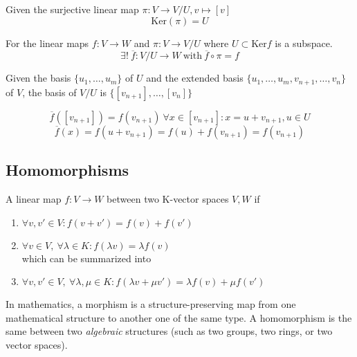 \begin{proposition}
   Given the surjective linear map \(\pi: V \to V/U, v \mapsto [v]\)
   \[\text{Ker}(\pi) = U\]
\end{proposition}
\begin{remark} %
   For the linear maps \(f: V \to W\) and \(\pi: V \to V/U\) where \(U \subset \text{Ker}f\) is a subspace.
   \[\exists!~\overline{f}: V/U \to W~\text{with}~\overline{f} \circ \pi = f\]

   \begin{center}
   \end{center}

   Given the basis \(\{u_1, \ldots, u_m\}\) of \(U\) and the extended basis \(\{u_1, \ldots, u_m, v_{n+1}, \ldots, v_n\}\) of \(V\), the basis of \(V/U\) is \(\{[v_{n+1}], \ldots, [v_n]\}\)

   \[\overline{f}([v_{n+1}]) = f(v_{n+1})~\forall x \in [v_{n+1}]: x = u + v_{n+1}, u \in U\]
   \[\overline{f}(x) = f(u + v_{n+1}) = f(u) + f(v_{n+1}) = f(v_{n+1})\]
\end{remark}

\subsection{Homomorphisms}
\begin{definition}[Homomorphism]
   A linear map \(f: V \to W\) between two K-vector spaces \(V, W\) if

   \begin{enumerate}[label=(\roman*)]
      \item \(\forall v, v' \in V: f(v + v') = f(v) + f(v')\)
      \item \(\forall v \in V,~\forall \lambda \in K: f(\lambda v) = \lambda f(v)\)\\
      which can be summarized into
      \item \(\forall v, v' \in V,~\forall \lambda, \mu \in K: f(\lambda v + \mu v') = \lambda f(v) + \mu f(v')\)
   \end{enumerate}
\end{definition}
\begin{remark}
   In mathematics, a morphism is a structure-preserving map from one mathematical structure to another one of the same type.
   A homomorphism is the same between two \textit{algebraic} structures (such as two groups, two rings, or two vector spaces).
\end{remark}

